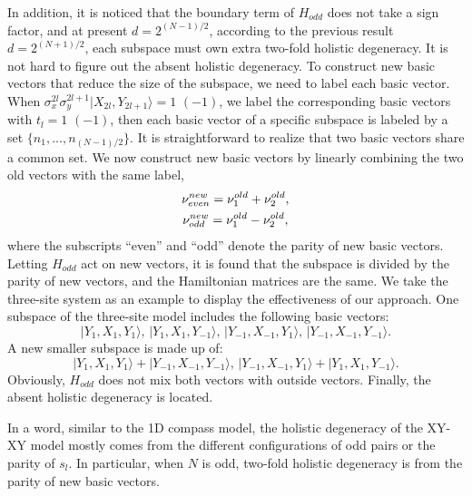 \documentclass[twocolumn,floats,superscriptaddress]{revtex4}
\begin{document}
 { In addition, it is noticed that the boundary term of $H_{odd}$ does not take a sign factor, and at present $d=2^{(N-1)/2}$, according to the previous result $d=2^{(N+1)/2}$, each subspace must own extra two-fold holistic degeneracy. It is not hard to figure out the absent holistic degeneracy. To construct new basic vectors that reduce the size of the subspace, we need to label each basic vector. When $\sigma_x^{2l}\sigma_y^{2l+1}|X_{2l}, Y_{2l+1}\rangle=1\,\, (-1)$, we label the corresponding basic vectors with $t_l=1 \,\,(-1)$, then each basic vector of a specific subspace is labeled by a set $\{n_1,...,n_{(N-1)/2}\}$.
It is straightforward to realize that two basic vectors share a common set. We now construct new basic vectors by linearly combining the two old vectors with the same label,
\begin{gather}
\nu_{even}^{new}=\nu_{1}^{old}+\nu_{2}^{old},\notag
\\
\nu_{odd}^{new}=\nu_{1}^{old}-\nu_{2}^{old},
\label{newv}
\end{gather}
where the subscripts ``even'' and ``odd'' denote the parity of new basic vectors. Letting $H_{odd}$ act on new vectors, it is found that the subspace is divided by the parity of new vectors, and the Hamiltonian matrices are the same. We take the three-site system as an example to display the effectiveness of our approach. One subspace of the three-site model includes the following basic vectors:
\begin{equation}\label{}
|Y_1, X_1, Y_1\rangle,\, |Y_1, X_1, Y_{-1}\rangle,\, |Y_{-1}, X_{-1}, Y_1\rangle,\, |Y_{-1}, X_{-1}, Y_{-1}\rangle.
\end{equation}
A new smaller subspace is made up of:
\begin{equation}\label{}
|Y_1, X_1, Y_1\rangle+|Y_{-1}, X_{-1}, Y_{-1}\rangle,\, |Y_{-1}, X_{-1}, Y_1\rangle+|Y_1, X_1, Y_{-1}\rangle.
\end{equation}
Obviously, $H_{odd}$ does not mix both vectors with outside vectors. Finally, the absent holistic degeneracy is located.
 }

 {In a word, similar to the 1D compass model, the holistic degeneracy of the XY-XY model mostly comes from the different configurations of odd pairs or the parity of $s_l$. In particular, when $N$ is odd, two-fold holistic degeneracy is from the parity of new basic vectors.}
\end{document}

